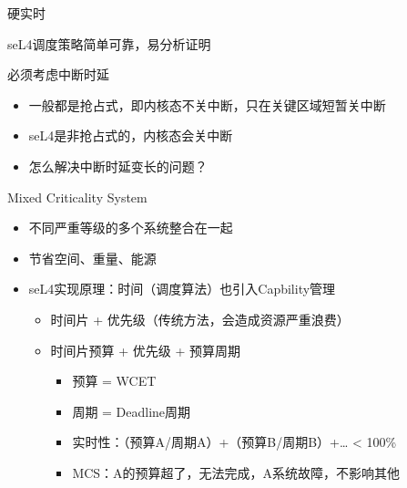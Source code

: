 \documentclass[presentation,dvipdfmx,CJKbookmarks]{beamer}
\begin{document}
\begin{CJK*}{UTF8}{simsun}
\begin{frame}[label={sec:orgcfb830c}]{硬实时}
\begin{block}{seL4\thinspace 调度策略简单可靠，易分析证明}
\end{block}
\begin{block}{必须考虑中断时延}
\begin{itemize}
\item 一般都是抢占式，即内核态不关中断，只在关键区域短暂关中断
\item seL4\thinspace 是非抢占式的，内核态会关中断
\item 怎么解决中断时延变长的问题？
\end{itemize}
\end{block}
\end{frame}

\begin{frame}[label={sec:org0ff30c1}]{Mixed Criticality System}
\begin{itemize}
\item 不同严重等级的多个系统整合在一起
\item 节省空间、重量、能源
\item seL4\thinspace 实现原理：时间（调度算法）也引入\thinspace Capbility\thinspace 管理
\begin{itemize}
\item {} 时间片 + 优先级（传统方法，会造成资源严重浪费）
\item {} 时间片预算 + 优先级 + 预算周期
\pause
\begin{itemize}
\item 预算 = WCET
\item 周期 = Deadline\thinspace 周期
\item 实时性：（预算\thinspace A/周期\thinspace A）+（预算\thinspace B/周期\thinspace B）+\ldots{} < 100\%
\item MCS：A\thinspace 的预算超了，无法完成，A\thinspace 系统故障，不影响其他
\end{itemize}
\end{itemize}
\end{itemize}
\end{frame}



\end{CJK*}
\end{document}
